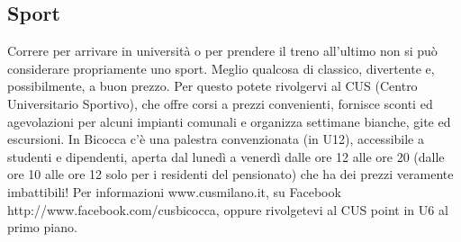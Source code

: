 \subsection{Sport}
Correre per arrivare in università o per prendere il treno all'ultimo non si può considerare propriamente uno sport. Meglio qualcosa di classico, divertente e, possibilmente, a buon prezzo.
Per questo potete rivolgervi al CUS (Centro Universitario Sportivo), che offre corsi a prezzi convenienti, fornisce sconti ed agevolazioni per alcuni impianti comunali e organizza settimane bianche, gite ed escursioni. In Bicocca c'è una palestra convenzionata (in U12), accessibile a studenti e dipendenti, aperta dal lunedì a venerdì dalle ore 12 alle ore 20 (dalle ore 10 alle ore 12 solo per i residenti del pensionato) che ha dei prezzi veramente imbattibili! Per informazioni www.cusmilano.it, su Facebook http://www.facebook.com/cusbicocca, oppure rivolgetevi al CUS point in U6 al primo piano.

